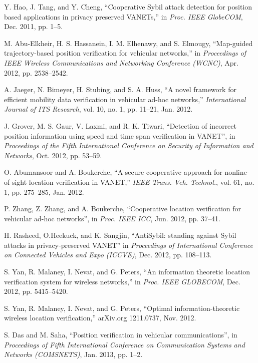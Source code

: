 \documentclass[journal]{IEEEtran}
\begin{document}
\begin{thebibliography}{1}
 Y. Hao, J. Tang, and Y. Cheng, ``Cooperative Sybil attack detection for position based applications in privacy preserved VANETs,'' in \emph{Proc. IEEE GlobeCOM}, Dec. 2011, pp. 1--5.

 M. Abu-Elkheir, H. S. Hassanein, I. M. Elhenawy, and S. Elmougy, ``Map-guided trajectory-based position verification for vehicular networks,'' in \emph{Proceedings of IEEE Wireless Communications and Networking Conference (WCNC)}, Apr. 2012, pp. 2538--2542.

 A. Jaeger, N. Bimeyer, H. Stubing, and S. A. Huss, ``A novel framework for efficient mobility data verification in vehicular ad-hoc networks,'' \emph{International Journal of ITS Research}, vol. 10, no. 1, pp. 11--21, Jan. 2012.

 J. Grover, M. S. Gaur, V. Laxmi, and R. K. Tiwari, ``Detection of incorrect position information using speed and time span verification in VANET'', in \emph{Proceedings of the Fifth International Conference on Security of Information and Networks}, Oct. 2012, pp. 53--59.

 O. Abumansoor and A. Boukerche, ``A secure cooperative approach for nonline-of-sight location verification in VANET,'' \textit{IEEE Trans. Veh. Technol.}, vol. 61, no. 1, pp. 275--285, Jan. 2012.

 P. Zhang, Z. Zhang, and A. Boukerche, ``Cooperative location verification for vehicular ad-hoc networks'', in \emph{Proc. IEEE ICC}, Jun. 2012, pp. 37--41.

 H. Rasheed, O.Heekuck, and K. Sangjin, ``AntiSybil: standing against Sybil attacks in privacy-preserved VANET'' in \emph{Proceedings of International Conference on Connected Vehicles and Expo (ICCVE)}, Dec. 2012, pp. 108--113.

 S. Yan, R. Malaney, I. Nevat, and G. Peters, ``An information theoretic location verification system for wireless networks,'' in \emph{Proc. IEEE GLOBECOM}, Dec. 2012, pp. 5415--5420.

 S. Yan, R. Malaney, I. Nevat, and G. Peters, ``Optimal information-theoretic wireless location verification,'' arXiv.org 1211.0737, Nov. 2012.

 S. Das and M. Saha, ``Position verification in vehicular communications'', in \emph{Proceedings of Fifth International Conference on Communication Systems and Networks (COMSNETS)}, Jan. 2013, pp. 1--2.


\end{thebibliography}
\end{document}
